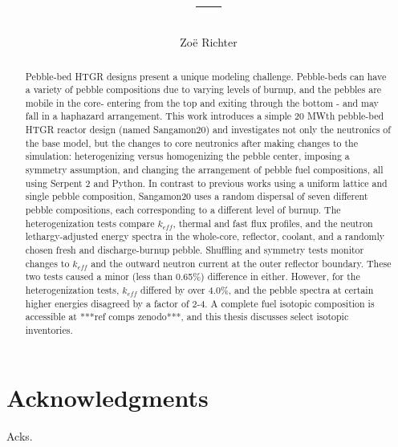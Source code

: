 \documentclass[edeposit,fullpage]{uiucthesis2018}
\title{---}
\author{Zo{\"e} Richter}
\begin{document}
\maketitle

\frontmatter
\begin{abstract}
Pebble-bed HTGR designs present a unique modeling challenge.  Pebble-beds can have a variety of pebble compositions due to varying levels of burnup, and the pebbles are mobile in the core- entering from the top and exiting through the bottom - and may fall in a haphazard arrangement.  This work introduces a simple 20 MWth pebble-bed HTGR reactor design (named Sangamon20) and investigates not only the neutronics of the base model, but the changes to core neutronics after making changes to the simulation: heterogenizing versus homogenizing the pebble center, imposing a symmetry assumption, and changing the arrangement of pebble fuel compositions, all using Serpent 2 and Python.  In contrast to previous works using a uniform lattice and single pebble composition, Sangamon20 uses a random dispersal of seven different pebble compositions, each corresponding to a different level of burnup.  The heterogenization tests compare $k_{eff}$, thermal and fast flux profiles, and the neutron lethargy-adjusted energy spectra in the whole-core, reflector, coolant, and a randomly chosen fresh and discharge-burnup pebble.  Shuffling and symmetry tests monitor changes to $k_{eff}$ and the outward neutron current at the outer reflector boundary.  These two tests caused a minor (less than 0.65\%) difference in either.  However, for the heterogenization tests, $k_{eff}$ differed by over 4.0\%, and the pebble spectra at certain higher energies disagreed by a factor of 2-4.  A complete fuel isotopic composition is accessible at ***ref comps zenodo***, and this thesis discusses select isotopic inventories.

\end{abstract}

\chapter*{Acknowledgments}

Acks.

\end{document}
